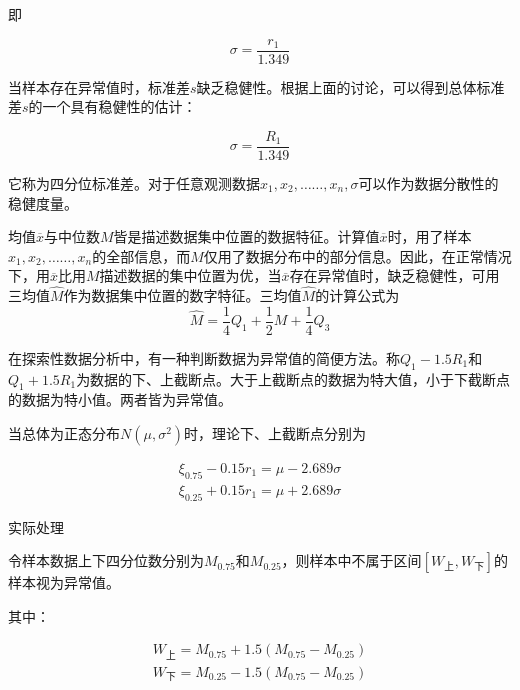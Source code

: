 \documentclass[UTF8]{ctexart}
\begin{document}
	即 \par
	\begin{equation}
		\sigma =\frac{r_1}{1.349}
	\end{equation}\par
	当样本存在异常值时，标准差$s$缺乏稳健性。根据上面的讨论，可以得到总体标准差$s$的一个具有稳健性的估计： \par
	\begin{equation}
		\sigma =\frac{R_1}{1.349}
	\end{equation}\par
	它称为四分位标准差。对于任意观测数据$x_1,x_2,……,x_n,\sigma$可以作为数据分散性的稳健度量。 \par
	均值$\overline{x}$与中位数$M$皆是描述数据集中位置的数据特征。计算值$\overline{x}$时，用了样本$x_1,x_2,……,x_n$的全部信息，而$M$仅用了数据分布中的部分信息。因此，在正常情况下，用$\overline{x}$比用$M$描述数据的集中位置为优，当$\overline{x}$存在异常值时，缺乏稳健性，可用三均值$\hat{M}$作为数据集中位置的数字特征。三均值$\hat{M}$的计算公式为 
	\begin{equation}
		\hat{M}=\frac{1}{4}Q_1+\frac{1}{2}M+\frac{1}{4}Q_3
	\end{equation}\par
	在探索性数据分析中，有一种判断数据为异常值的简便方法。称$Q_1-1.5R_1$和$Q_1+1.5R_1$为数据的下、上截断点。大于上截断点的数据为特大值，小于下截断点的数据为特小值。两者皆为异常值。 \par
	当总体为正态分布$N\left( \mu ,\sigma ^2 \right) $时，理论下、上截断点分别为 \par
	\begin{equation}
		\begin{aligned}
			\xi _{0.75}-0.15r_1=\mu -2.689\sigma 
			\\
			\xi _{0.25}+0.15r_1=\mu +2.689\sigma 
		\end{aligned}
	\end{equation}\par
	[2]实际处理\par
	令样本数据上下四分位数分别为$M_{0.75}$和$M_{0.25}$，则样本中不属于区间$\left[ W_{\text{上}},W_{\text{下}} \right] $的样本视为异常值。 \par
	其中： \par
	\begin{equation}
		\begin{aligned}
			W_{\text{上}}=M_{0.75}+1.5\left( M_{0.75}-M_{0.25} \right) 
			\\
			W_{\text{下}}=M_{0.25}-1.5\left( M_{0.75}-M_{0.25} \right) 
		\end{aligned}
	\end{equation}\par
\end{document}
